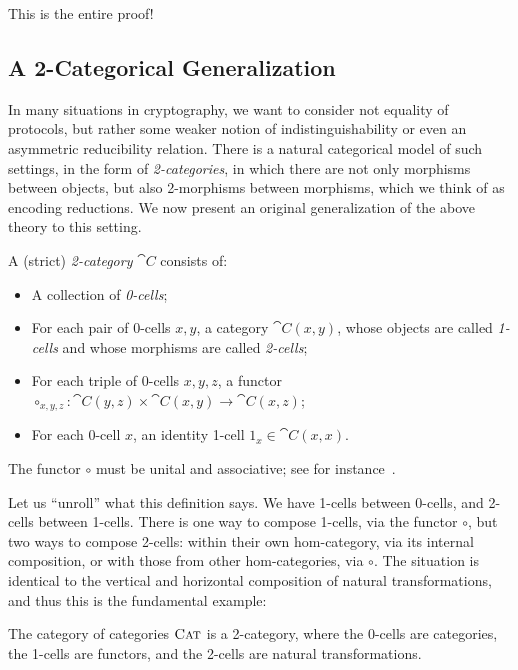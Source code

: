This is the entire proof!

\subsection{A 2-Categorical Generalization}
\label{sec:2-cat}

In many situations in cryptography, we want to consider not
equality of protocols, but rather some weaker notion of indistinguishability or
even an asymmetric reducibility relation. There is a natural categorical model
of such settings, in the form of \emph{2-categories}, in which there are not
only morphisms between objects, but also 2-morphisms between morphisms, which we
think of as encoding reductions. We now present an original generalization of
the above theory to this setting.

\begin{dfn}
  A (strict) \emph{2-category} $\cat{C}$ consists of:
  \begin{itemize}
    \item A collection of \emph{0-cells};
    \item For each pair of 0-cells $x,y$, a category $\cat{C}(x, y)$, whose
      objects are called \emph{1-cells} and whose morphisms are called
      \emph{2-cells};
    \item For each triple of 0-cells $x,y,z$, a functor $\circ_{x,y,z}: \cat{C}(y, z)\times \cat{C}(x, y)\to \cat{C}(x, z)$;
    \item For each 0-cell $x$, an identity 1-cell $1_x\in\cat{C}(x, x)$.
  \end{itemize}
  The functor $\circ$ must be unital and associative; see for instance~\cite{kelly-1981}.
\end{dfn}

Let us ``unroll'' what this definition says. We have 1-cells between 0-cells,
and 2-cells between 1-cells. There is one way to compose 1-cells, via the
functor $\circ$, but two ways to compose 2-cells: within their own hom-category,
via its internal composition, or with those from other hom-categories, via
$\circ$. The situation is identical to the vertical and horizontal composition
of natural transformations, and thus this is the fundamental example:

\begin{ex}
  The category of categories ${\textsc{\text{Cat}}}$ is a 2-category, where the 0-cells are
  categories, the 1-cells are functors, and the 2-cells are natural
  transformations.
\end{ex}

